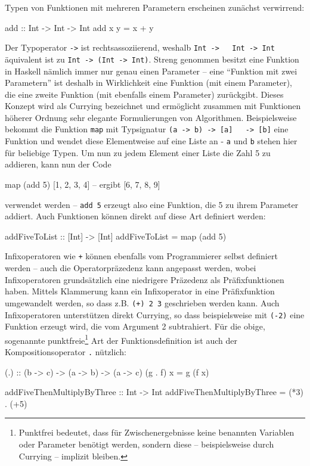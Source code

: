 \documentclass[11pt, a4paper, bibgerm]{scrbook}
\newenvironment{DIFnomarkup}{}{}
\newcommand\icode[1]{\lstinline?#1?}
\begin{document}
Typen von Funktionen mit mehreren Parametern erscheinen
zunächst verwirrend:
\begin{DIFnomarkup}\begin{code}
add :: Int -> Int -> Int
add x y = x + y  
\end{code}\end{DIFnomarkup}
Der Typoperator \icode{->} ist rechtsassoziierend, weshalb \icode{Int ->
  Int -> Int} äquivalent ist zu \icode{Int -> (Int -> Int)}. Streng
genommen besitzt eine Funktion in Haskell nämlich immer nur genau einen
Parameter -- eine "`Funktion mit zwei Parametern"' ist deshalb in
Wirklichkeit eine Funktion (mit einem Parameter), die eine zweite
Funktion (mit ebenfalls einem Parameter) zurückgibt. Dieses Konzept wird
als Currying bezeichnet und ermöglicht zusammen mit Funktionen höherer
Ordnung sehr elegante Formulierungen von Algorithmen. Beispielsweise
bekommt die Funktion \icode{map} mit Typsignatur \icode{(a -> b) -> [a]
  -> [b]} eine Funktion und wendet diese Elementweise auf eine Liste an
- \icode{a} und \icode{b} stehen hier für beliebige Typen. Um nun zu
jedem Element einer Liste die Zahl 5 zu addieren, kann nun der Code
\begin{DIFnomarkup}\begin{code}
map (add 5) [1, 2, 3, 4]  -- ergibt [6, 7, 8, 9]
\end{code}\end{DIFnomarkup}
verwendet werden -- \icode{add 5} erzeugt also eine Funktion, die 5 zu
ihrem Parameter addiert. Auch Funktionen können direkt auf diese Art
definiert werden:
\begin{DIFnomarkup}\begin{code}
addFiveToList :: [Int] -> [Int]
addFiveToList = map (add 5)
\end{code}\end{DIFnomarkup}

Infixoperatoren wie \icode{+} können ebenfalls vom Programmierer selbst
definiert werden -- auch die Operatorpräzedenz kann angepasst werden,
wobei Infixoperatoren grundsätzlich eine niedrigere Präzedenz als
Präfixfunktionen haben. Mittels Klammerung kann ein Infixoperator in
eine Präfixfunktion umgewandelt werden, so dass z.B. \icode{(+) 2 3}
geschrieben werden kann. Auch Infixoperatoren unterstützen direkt
Currying, so dass beispielsweise mit \icode{(-2)} eine Funktion erzeugt
wird, die vom Argument 2 subtrahiert. Für die obige, sogenannte
punktfreie\footnote{Punktfrei bedeutet, dass für Zwischenergebnisse
  keine benannten Variablen oder Parameter benötigt werden, sondern
  diese -- beispielsweise durch Currying -- implizit bleiben.} Art der
Funktionsdefinition ist auch der Kompositionsoperator \icode{.}
nützlich:
\begin{DIFnomarkup}\begin{code}
(.) :: (b -> c) -> (a -> b) -> (a -> c)
(g . f) x = g (f x)

addFiveThenMultiplyByThree :: Int -> Int
addFiveThenMultiplyByThree = (*3) . (+5)
\end{code}\end{DIFnomarkup}
\end{document}
